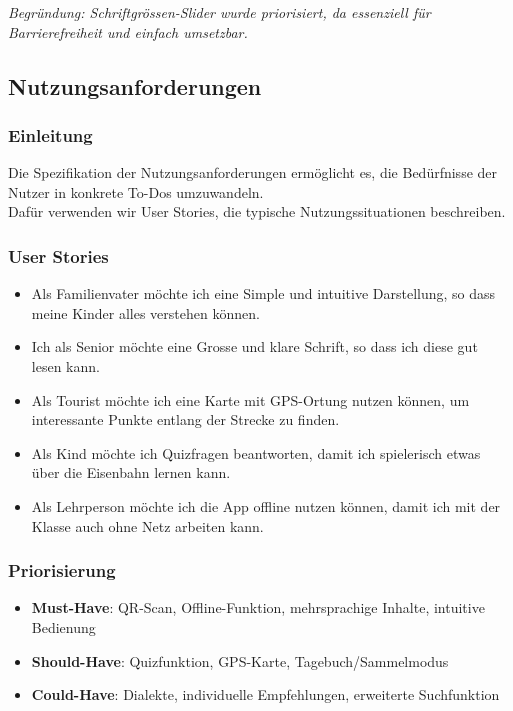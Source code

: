 \documentclass[10pt]{article}
\begin{document}
	\textit{Begründung: Schriftgrössen-Slider wurde priorisiert, da essenziell für Barrierefreiheit und einfach umsetzbar.}
	\pagebreak
	\subsection{Nutzungsanforderungen}
	\subsubsection{Einleitung}
	Die Spezifikation der Nutzungsanforderungen ermöglicht es, die Bedürfnisse der Nutzer in konkrete To-Dos umzuwandeln.\\
	Dafür verwenden wir User Stories, die typische Nutzungssituationen beschreiben.
	\subsubsection{User Stories}
	\begin{itemize}
		\item Als Familienvater möchte ich eine Simple und intuitive Darstellung, so dass meine Kinder alles verstehen können.
		\item Ich als Senior möchte eine Grosse und klare Schrift, so dass ich diese gut lesen kann.
		\item Als Tourist möchte ich eine Karte mit GPS-Ortung nutzen können, um interessante Punkte entlang der Strecke zu finden.
		\item Als Kind möchte ich Quizfragen beantworten, damit ich spielerisch etwas über die Eisenbahn lernen kann.
		\item Als Lehrperson möchte ich die App offline nutzen können, damit ich mit der Klasse auch ohne Netz arbeiten kann.
	\end{itemize}
	
	\subsubsection{Priorisierung}
	\begin{itemize}
		\item \textbf{Must-Have}: QR-Scan, Offline-Funktion, mehrsprachige Inhalte, intuitive Bedienung
		\item \textbf{Should-Have}: Quizfunktion, GPS-Karte, Tagebuch/Sammelmodus
		\item \textbf{Could-Have}: Dialekte, individuelle Empfehlungen, erweiterte Suchfunktion
	\end{itemize}
	
\end{document}

